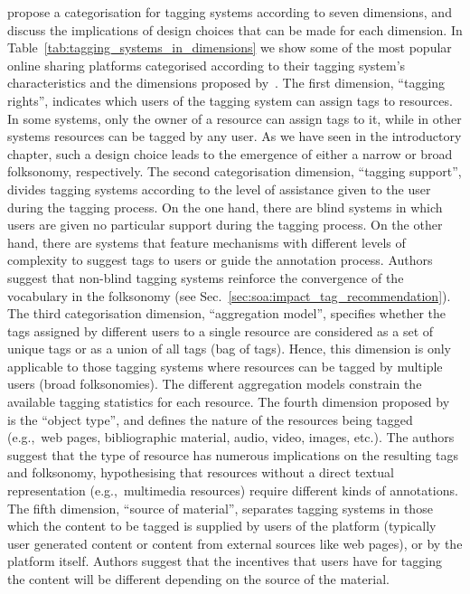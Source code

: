 \cite{marlow2006} propose a categorisation for tagging systems according to seven dimensions, and discuss the implications of design choices that can be made for each dimension.
In Table~\ref{tab:tagging_systems_in_dimensions} we show some of the most popular online sharing platforms categorised according to their tagging system's characteristics and the dimensions proposed by~\cite{marlow2006}.   
The first dimension, ``tagging rights'', indicates which users of the tagging system can assign tags to resources. In some systems, only the owner of a resource can assign tags to it, while in other systems resources can be tagged by any user.
As we have seen in the introductory chapter, such a design choice leads to the emergence of either a narrow or broad folksonomy, respectively.
The second categorisation dimension, ``tagging support'', divides tagging systems according to the level of assistance given to the user during the tagging process. 
On the one hand, there are blind systems in which users are given no particular support during the tagging process. On the other hand, there are systems that feature mechanisms with different levels of complexity to suggest tags to users or guide the annotation process. Authors suggest that non-blind tagging systems reinforce the convergence of the vocabulary in the folksonomy (see Sec.~\ref{sec:soa:impact_tag_recommendation}).
The third categorisation dimension, ``aggregation model'', specifies whether the tags assigned by different users to a single resource are considered as a set of unique tags or as a union of all tags (bag of tags).
Hence, this dimension is only applicable to those tagging systems where resources can be tagged by multiple users (broad folksonomies). The different aggregation models constrain the available tagging statistics for each resource.
The fourth dimension proposed by~\cite{marlow2006} is the ``object type'', and defines the nature of the resources being tagged (e.g.,~web pages, bibliographic material, audio, video, images, etc.). The authors suggest that the type of resource has numerous implications on the resulting tags and folksonomy, hypothesising that resources without a direct textual representation (e.g.,~multimedia resources) require different kinds of annotations.
The fifth dimension, ``source of material'', separates tagging systems in those which the content to be tagged is supplied by users of the platform (typically user generated content or content from external sources like web pages), or by the platform itself. Authors suggest that the incentives that users have for tagging the content will be different depending on the source of the material.
